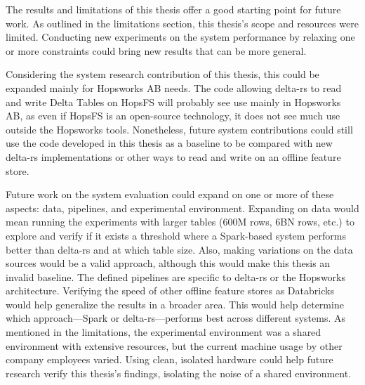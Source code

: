 The results and limitations of this thesis offer a good starting point for future work. As outlined in the limitations section, this thesis's scope and resources were limited. Conducting new experiments on the system performance by relaxing one or more constraints could bring new results that can be more general.

Considering the system research contribution of this thesis, this could be expanded mainly for Hopsworks \gls{AB} needs. The code allowing delta-rs to read and write Delta Tables on \gls{HopsFS} will probably see use mainly in Hopsworks \gls{AB}, as even if \gls{HopsFS} is an open-source technology, it does not see much use outside the Hopsworks tools. Nonetheless, future system contributions could still use the code developed in this thesis as a baseline to be compared with new delta-rs implementations or other ways to read and write on an offline feature store.

Future work on the system evaluation could expand on one or more of these aspects: data, pipelines, and experimental environment. Expanding on data would mean running the experiments with larger tables (600M rows, 6BN rows, etc.) to explore and verify if it exists a threshold where a Spark-based system performs better than delta-rs and at which table size. Also, making variations on the data sources would be a valid approach, although this would make this thesis an invalid baseline. The defined pipelines are specific to delta-rs or the Hopsworks architecture. Verifying the speed of other offline feature stores as Databricks would help generalize the results in a broader area. This would help determine which approach—Spark or delta-rs—performs best across different systems.
As mentioned in the limitations, the experimental environment was a shared environment with extensive resources, but the current machine usage by other company employees varied. Using clean, isolated hardware could help future research verify this thesis's findings, isolating the noise of a shared environment.